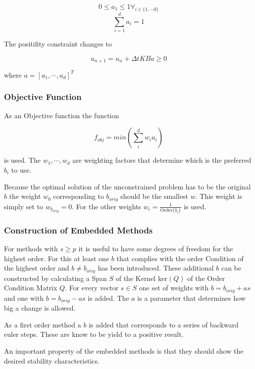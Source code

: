 \documentclass{article}
\begin{document}
\begin{equation}
 0 \leq a_1 \leq 1  \forall_{i \in \{1, \cdots d \}}
\end{equation}
\begin{equation}
 \sum_{i=1}^d a_i = 1
\end{equation}


The positifity constraint changes to 

$$u_{n+1}=u_n+\Delta t K B a \geq 0$$

where $a = [a_1,\cdots,a_d]^T$


\subsubsection{Objective Function}

As an Objective function the function

\begin{equation}
f_{obj} = min \left(\sum_i^d w_i a_i \right)
\end{equation}

is used.  The $w_1,\cdots,w_d$ are weighting factors that determine which is the preferred $b_i$ to use.

Because the optimal solution of the unconstrained problem has to be the original $b$ the weight $w_0$ corresponding to $b_{orig}$ should be the smallest $w$. This weight is simply set to $w_{b_{orig}} = 0$. For the other weights $w_i = \frac{1}{\mathrm{Order} \{b_i\}}$ is used.

\subsubsection{Construction of Embedded Methods}
For methods with $s \geq p$ it is useful to have some degrees of freedom for the highest order. For this at least one $b$ that complies with the order Condition of the highest order and $b \neq b_{orig}$ has been introduced.
These additional $b$ can be constructed by calculating a Span $S$ of the Kernel $\mathrm{ker} (Q)$ of the Order Condition Matrix $Q$. For every vector $s \in S$ one set of weights with $b = b_{orig} + a s$ and one with $b = b_{orig} - a s$ is added. The $a$ is a parameter that determines how big a change is allowed. 

As a first order method a $b$ is added that corresponds to a series of backward euler steps. These are know to be yield to a positive result.

An important property of the embedded methods is that they should show the desired stability characteristics.
\end{document}
